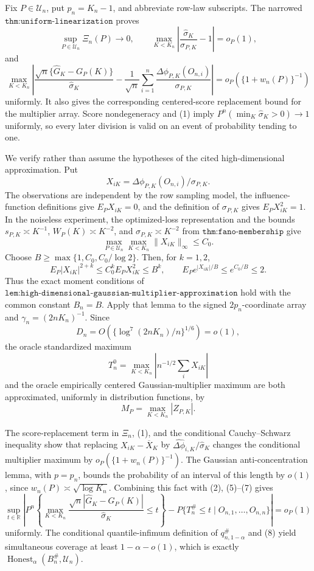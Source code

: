Fix \(P\in\mathcal U_n\), put \(p_n=K_n-1\), and abbreviate row-law subscripts.  The narrowed \(\texttt{thm:uniform-linearization}\) proves
\[
 \sup_{P\in\mathcal U_n}\Xi_n(P)\to0,
 \qquad
 \max_{K<K_n}\left|\frac{\widehat\sigma_K}{\sigma_{P,K}}-1\right|=o_P(1),       \tag{1}
\]
and
\[
 \max_{K<K_n}\left|
 \frac{\sqrt n\{\widehat G_K-G_P(K)\}}{\widehat\sigma_K}
 -\frac1{\sqrt n}\sum_{i=1}^n\frac{\Delta\phi_{P,K}(O_{n,i})}{\sigma_{P,K}}
 \right|=o_P\!\left(\{1+w_n(P)\}^{-1}\right)                                  \tag{2}
\]
uniformly.  It also gives the corresponding centered-score replacement bound for the multiplier array.  Score nondegeneracy and (1) imply \(P^n(\min_K\widehat\sigma_K>0)\to1\) uniformly, so every later division is valid on an event of probability tending to one.

We verify rather than assume the hypotheses of the cited high-dimensional approximation.  Put
\[
 X_{iK}=\Delta\phi_{P,K}(O_{n,i})/\sigma_{P,K}.
\]
The observations are independent by the row sampling model, the influence-function definitions give \(E_PX_{iK}=0\), and the definition of \(\sigma_{P,K}\) gives \(E_PX_{iK}^2=1\).  In the noiseless experiment, the optimized-loss representation and the bounds \(s_{P,K}\asymp K^{-1}\), \(W_P(K)\asymp K^{-2}\), and \(\sigma_{P,K}\asymp K^{-2}\) from \(\texttt{thm:fano-membership}\) give
\[
 \max_{P\in\mathcal U_n}\max_{K<K_n}\|X_{iK}\|_\infty\leq C_0.               \tag{3}
\]
Choose \(B\geq\max\{1,C_0,C_0/\log2\}\).  Then, for \(k=1,2\),
\[
 E_P|X_{iK}|^{2+k}\leq C_0^kE_PX_{iK}^2\leq B^k,
 \qquad E_Pe^{|X_{iK}|/B}\leq e^{C_0/B}\leq2.                                  \tag{4}
\]
Thus the exact moment conditions of \(\texttt{lem:high-dimensional-gaussian-multiplier-approximation}\) hold with the common constant \(B_n=B\).  Apply that lemma to the signed \(2p_n\)-coordinate array and \(\gamma_n=(2nK_n)^{-1}\).  Since
\[
 D_n=O\!\left(\{\log^7(2nK_n)/n\}^{1/6}\right)=o(1),                            \tag{5}
\]
the oracle standardized maximum
\[
 T_n^0=\max_{K<K_n}\left|n^{-1/2}\sum_iX_{iK}\right|                           \tag{6}
\]
and the oracle empirically centered Gaussian-multiplier maximum are both approximated, uniformly in distribution functions, by
\[
 M_P=\max_{K<K_n}|Z_{P,K}|.                                                       \tag{7}
\]

The score-replacement term in \(\Xi_n\), (1), and the conditional Cauchy--Schwarz inequality show that replacing \(X_{iK}-\overline X_K\) by \(\widehat{\Delta\phi}_{i,K}/\widehat\sigma_K\) changes the conditional multiplier maximum by \(o_P(\{1+w_n(P)\}^{-1})\).  The Gaussian anti-concentration lemma, with \(p=p_n\), bounds the probability of an interval of this length by \(o(1)\), since \(w_n(P)\asymp\sqrt{\log K_n}\).  Combining this fact with (2), (5)--(7) gives
\[
 \sup_{t\in\mathbb R}\left|
 P^n\!\left\{\max_{K<K_n}\frac{\sqrt n|\widehat G_K-G_P(K)|}{\widehat\sigma_K}\leq t\right\}
 -P\{T_n^{\#}\leq t\mid O_{n,1},\ldots,O_{n,n}\}
 \right|=o_P(1)                                                                  \tag{8}
\]
uniformly.  The conditional quantile-infimum definition of \(q_{n,1-\alpha}^{\#}\) and (8) yield simultaneous coverage at least \(1-\alpha-o(1)\), which is exactly \(\operatorname{Honest}_{\alpha}(B_n^{\#},\mathcal U_n)\).

